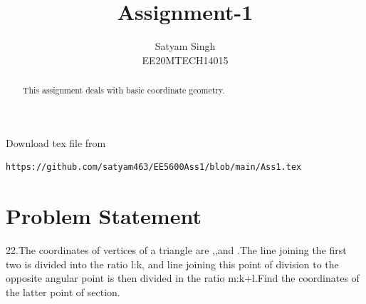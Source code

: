 \documentclass[journal,12pt,twocolumn]{IEEEtran}
\begin{document}
\renewcommand{\thefigure}{\theproblem}
\def\putbox#1#2#3{\makebox[0in][l]{\makebox[#1][l]{}\raisebox{\baselineskip}[0in][0in]{\raisebox{#2}[0in][0in]{#3}}}}
     \def\rightbox#1{\makebox[0in][r]{#1}}
     \def\centbox#1{\makebox[0in]{#1}}
     \def\topbox#1{\raisebox{-\baselineskip}[0in][0in]{#1}}
     \def\midbox#1{\raisebox{-0.5\baselineskip}[0in][0in]{#1}}
\vspace{3cm}
\title{Assignment-1}
\author{Satyam Singh \\ EE20MTECH14015}
\maketitle
\newpage
\bigskip
\renewcommand{\thefigure}{\theenumi}
\renewcommand{\thetable}{\theenumi}
\begin{abstract}
This assignment deals with basic coordinate geometry.
\end{abstract}
Download  tex file from 
\begin{lstlisting}
https://github.com/satyam463/EE5600Ass1/blob/main/Ass1.tex
\end{lstlisting}
\section{Problem Statement}
22.The coordinates of vertices of a triangle are ,,and .The line joining the first two is divided into the ratio l:k, and line joining this point of division to the opposite angular point is then divided in the ratio m:k+l.Find the coordinates of the latter point of section.
\end{document}

